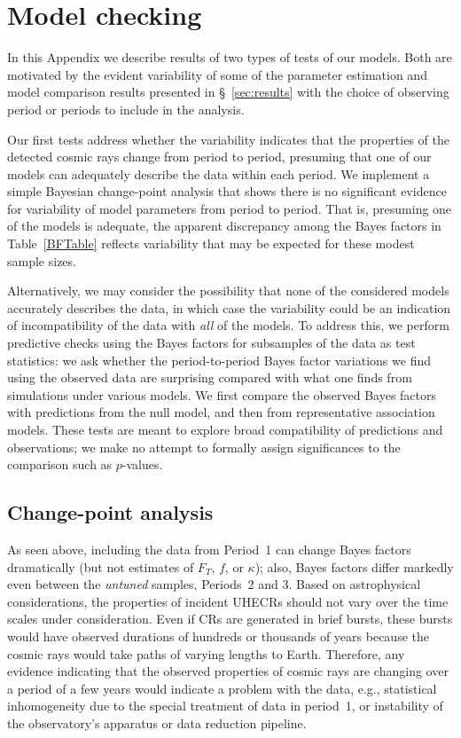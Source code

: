 \section{Model checking}
\label{app:checking}

In this Appendix we describe results of two types of tests of our models.
Both are motivated by the evident variability of some of the parameter
estimation and model comparison results presented in \S~\ref{sec:results}
with the choice of observing period or periods to include in the analysis.

Our first tests address whether the variability indicates that the
properties of the detected cosmic rays change from period to period,
presuming that one of our models can adequately describe the data within
each period.  We implement a simple Bayesian change-point analysis that shows
there is no significant evidence for variability of model parameters from
period to period.  That is, presuming one of the models is adequate, the
apparent discrepancy among the Bayes factors in Table~\ref{BFTable} reflects
variability that may be expected for these modest sample sizes.

Alternatively, we may consider the possibility that none of the considered
models accurately describes the data, in which case the variability could be
an indication of incompatibility of the data with {\em all} of the models.
To address this, we perform predictive checks using the Bayes factors for
subsamples of the data as test statistics:  we ask whether the
period-to-period Bayes factor variations we find using the observed data
are surprising compared with what one finds from simulations under various
models.  We first compare the observed Bayes factors with predictions from the
null model, and then from representative association models.  These tests
are meant to explore broad compatibility of predictions and
observations; we make no attempt to formally assign significances to the
comparison such as $p$-values.

\subsection{Change-point analysis}

As seen above, including the data from Period~1 can change Bayes factors
dramatically (but not estimates of $F_T$, $f$, or $\kappa$); also, Bayes
factors differ markedly even between the {\em untuned} samples, Periods~2
and 3.  Based on astrophysical considerations, the properties of incident
UHECRs should not vary over the time scales under consideration.  Even if CRs
are generated in brief bursts, these bursts would have observed durations of
hundreds or thousands of years because the cosmic rays would take paths of
varying lengths to Earth.  Therefore, any evidence indicating that the
observed properties of cosmic rays are changing over a period of a few years
would indicate a problem with the data, e.g., statistical inhomogeneity due to
the special treatment of data in period~1, or instability of the observatory's
apparatus or data reduction pipeline.

